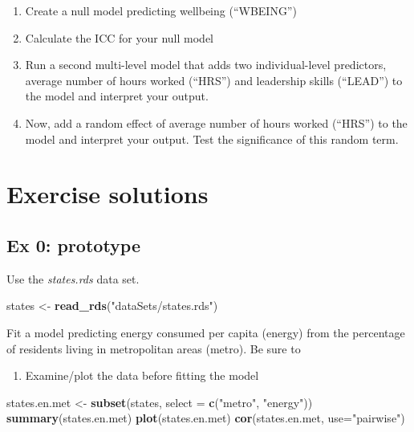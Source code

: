 \documentclass[]{book}
\newenvironment{Shaded}{\begin{snugshade}}{\end{snugshade}}
\newcommand{\KeywordTok}[1]{\textcolor[rgb]{0.13,0.29,0.53}{\textbf{#1}}}
\newcommand{\DataTypeTok}[1]{\textcolor[rgb]{0.13,0.29,0.53}{#1}}
\newcommand{\StringTok}[1]{\textcolor[rgb]{0.31,0.60,0.02}{#1}}
\newcommand{\NormalTok}[1]{#1}
\providecommand{\tightlist}{%
  \setlength{\itemsep}{0pt}\setlength{\parskip}{0pt}}
\begin{document}
\begin{enumerate}
\def\labelenumi{\arabic{enumi}.}
\tightlist
\item
  Create a null model predicting wellbeing (``WBEING'')
\item
  Calculate the ICC for your null model
\item
  Run a second multi-level model that adds two individual-level
  predictors, average number of hours worked (``HRS'') and leadership
  skills (``LEAD'') to the model and interpret your output.
\item
  Now, add a random effect of average number of hours worked (``HRS'')
  to the model and interpret your output. Test the significance of this
  random term.
\end{enumerate}

\section{Exercise solutions}\label{exercise-solutions-1}

\subsection{Ex 0: prototype}\label{ex-0-prototype-1}

Use the \emph{states.rds} data set.

\begin{Shaded}
\begin{Highlighting}[]
\NormalTok{  states <-}\StringTok{ }\KeywordTok{read_rds}\NormalTok{(}\StringTok{"dataSets/states.rds"}\NormalTok{)}
\end{Highlighting}
\end{Shaded}

Fit a model predicting energy consumed per capita (energy) from the
percentage of residents living in metropolitan areas (metro). Be sure to

\begin{enumerate}
\def\labelenumi{\arabic{enumi}.}
\tightlist
\item
  Examine/plot the data before fitting the model
\end{enumerate}

\begin{Shaded}
\begin{Highlighting}[]
\NormalTok{  states.en.met <-}\StringTok{ }\KeywordTok{subset}\NormalTok{(states, }\DataTypeTok{select =} \KeywordTok{c}\NormalTok{(}\StringTok{"metro"}\NormalTok{, }\StringTok{"energy"}\NormalTok{))}
  \KeywordTok{summary}\NormalTok{(states.en.met)}
  \KeywordTok{plot}\NormalTok{(states.en.met)}
  \KeywordTok{cor}\NormalTok{(states.en.met, }\DataTypeTok{use=}\StringTok{"pairwise"}\NormalTok{)}
\end{Highlighting}
\end{Shaded}
\end{document}
